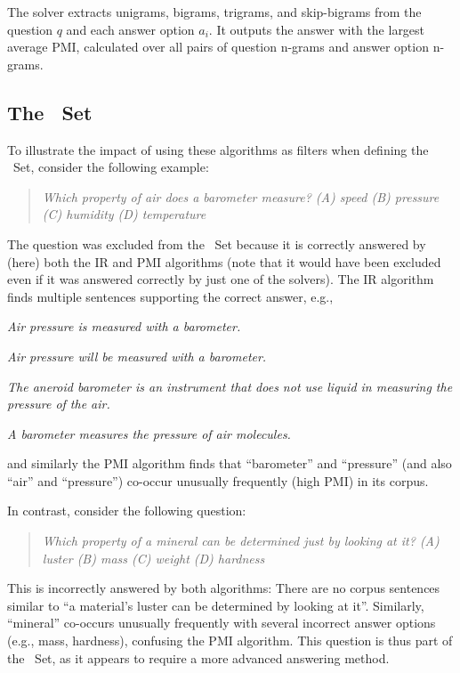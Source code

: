 The solver extracts unigrams, bigrams, trigrams, and skip-bigrams from the question $q$ and each answer option $a_i$.
It outputs the answer with the largest average PMI, calculated over all pairs of question n-grams and answer option n-grams.

\subsection{The \Challenge~Set}

To illustrate the impact of using these algorithms as filters when defining the \Challenge~Set, consider the following example:
\begin{quote}
{\it Which property of air does a barometer measure? (A) speed (B) pressure {\bfit [correct]} (C) humidity (D) temperature}
\end{quote}
The question was excluded from the \Challenge~Set because it is correctly answered by (here) both the IR and PMI algorithms (note that it would have been excluded even if it was answered correctly by just one of the solvers). The IR algorithm finds multiple sentences supporting the correct answer, e.g.,
\begin{ite}
\item {\it Air pressure is measured with a barometer.}
\item {\it Air pressure will be measured with a barometer.}
\item {\it The aneroid barometer is an instrument that does not use liquid in measuring the pressure of the air.}
\item {\it A barometer measures the pressure of air molecules.}
\end{ite}
and similarly the PMI algorithm finds that ``barometer'' and ``pressure'' (and also ``air'' and ``pressure'') co-occur unusually frequently (high PMI) in its corpus.

\noindent
In contrast, consider the following question:
\begin{quote}
{\it Which property of a mineral can be determined just by looking at it? (A) luster {\bfit [correct]} (B) mass (C) weight (D) hardness}
\end{quote}
This is incorrectly answered by both algorithms: There are no corpus sentences similar to ``a material's luster can be determined by looking at it''. Similarly, ``mineral'' co-occurs unusually frequently with several incorrect answer options (e.g., mass, hardness), confusing the PMI algorithm. This question is thus part of the \Challenge~Set, as it appears to require a more advanced answering method.

